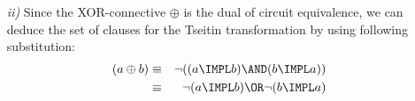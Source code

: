 {\begin{enumerate}
\begin{eqnarray*}
	l_{i\prime}) \OR l_i)](l_{i^{\prime \prime }}\AND [((l_{i\prime} \AND\neg
	l_{i\prime\prime}) \OR l_i) \AND ((l_{i\prime\prime} \AND\neg l_{i\prime})
	\OR l_i)]\lnot l_{i^{\prime }}))\OR l_{i}] \\
	&\Longleftrightarrow &(\lnot l_{i}\OR\lnot l_{i^{\prime }}\OR l_{i^{\prime
	\prime }})\AND(\lnot l_{i}\OR\lnot l_{i^{\prime \prime }}\OR l_{i^{\prime }})%
	\AND [((l_{i\prime} \AND\neg l_{i\prime\prime}) \AND (l_{i\prime\prime}
	\AND\neg l_{i\prime})) \OR l_{i}][((l_{i^{\prime }}\AND [((l_{i\prime}
	\AND\neg l_{i\prime\prime}) \OR l_i) \AND ((l_{i\prime\prime} \AND\neg
	l_{i\prime}) \OR l_i)]l_{i^{\prime \prime }})\AND [((l_{i\prime} \AND\neg
	l_{i\prime\prime}) \OR l_i) \AND ((l_{i\prime\prime} \AND\neg l_{i\prime})
	\OR l_i)](\lnot l_{i^{\prime }}\AND [((l_{i\prime} \AND\neg
	l_{i\prime\prime}) \OR l_i) \AND ((l_{i\prime\prime} \AND\neg l_{i\prime})
	\OR l_i)]\lnot l_{i^{\prime \prime }}))\OR l_{i}] \\
	&\Longleftrightarrow &(\lnot l_{i}\OR\lnot l_{i^{\prime }}\OR l_{i^{\prime
	\prime }})\AND(\lnot l_{i}\OR\lnot l_{i^{\prime \prime }}\OR l_{i^{\prime }})%
	\AND [((l_{i\prime} \AND\neg l_{i\prime\prime}) \AND (l_{i\prime\prime}
	\AND\neg l_{i\prime})) \OR l_{i}][((\lnot l_{i^{\prime }}\OR\lnot
	l_{i^{\prime \prime }})\AND [((l_{i\prime} \AND\neg l_{i\prime\prime}) \OR
	l_i) \AND ((l_{i\prime\prime} \AND\neg l_{i\prime}) \OR l_i)](l_{i^{\prime
	}}\OR l_{i^{\prime \prime }}))\OR l_{i}] \\
	&\Longleftrightarrow &(\lnot l_{i}\OR\lnot l_{i^{\prime }}\OR l_{i^{\prime
	\prime }})\AND(\lnot l_{i}\OR l_{i^{\prime }}\OR\lnot l_{i^{\prime \prime }})%
	\AND [((l_{i\prime} \AND\neg l_{i\prime\prime}) \AND (l_{i\prime\prime}
	\AND\neg l_{i\prime})) \OR l_{i}](l_{i}\OR\lnot l_{i^{\prime }}\OR\lnot
	l_{i^{\prime \prime }})\AND(l_{i}\OR l_{i^{\prime }}\OR l_{i^{\prime \prime
	}})
	\end{eqnarray*}

	\item[\textit{ii)}] Since the \textrm{XOR}-connective $\oplus $ is the dual
	of circuit equivalence, we can deduce the set of clauses for the Tseitin
	transformation by using following substitution:%
	\begin{eqnarray*}
	(a\oplus b) &\equiv &\lnot ((a\IMPL b)\AND (b\IMPL a)) \\
	&\equiv &\lnot (a\IMPL b)\OR\lnot (b\IMPL a)
	\end{eqnarray*}


\end{enumerate}}
